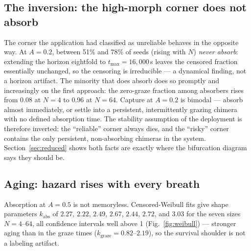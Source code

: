 \documentclass[pdflatex,sn-mathphys,Numbered]{sn-jnl}
\begin{document}
\subsection{The inversion: the high-morph corner does not absorb}

The corner the application had classified as unreliable behaves in the opposite way.
At $A = 0.2$, between 51\% and 78\% of seeds (rising with $N$) \emph{never absorb}:
extending the horizon eightfold to $t_{\max} = 16{,}000$\,s leaves the censored
fraction essentially unchanged, so the censoring is irreducible --- a dynamical
finding, not a horizon artifact. The minority that does absorb does so promptly and
increasingly on the first approach: the zero-graze fraction among absorbers rises
from 0.08 at $N = 4$ to 0.96 at $N = 64$. Capture at $A = 0.2$ is bimodal ---
absorb almost immediately, or settle into a persistent, intermittently grazing
chimera~\cite{sudaokuda2015} with no defined absorption time. The stability assumption of the deployment is
therefore inverted: the ``reliable'' corner always dies, and the ``risky'' corner
contains the only persistent, non-absorbing chimeras in the system. Section~\ref{sec:reduced} shows
both facts are exactly where the bifurcation diagram says they should be.

\subsection{Aging: hazard rises with every breath}

Absorption at $A = 0.5$ is not memoryless. Censored-Weibull fits give shape
parameters $k_{\mathrm{abs}}$ of $2.27$, $2.22$, $2.49$, $2.67$, $2.44$, $2.72$, and
$3.03$ for the seven sizes $N = 4$--$64$, all confidence intervals well above 1 (Fig.~\ref{fig:weibull}) ---
stronger aging than in the graze times ($k_{\mathrm{graze}} = 0.82$--$2.19$), so the
survival shoulder is not a labeling artifact.
\end{document}
